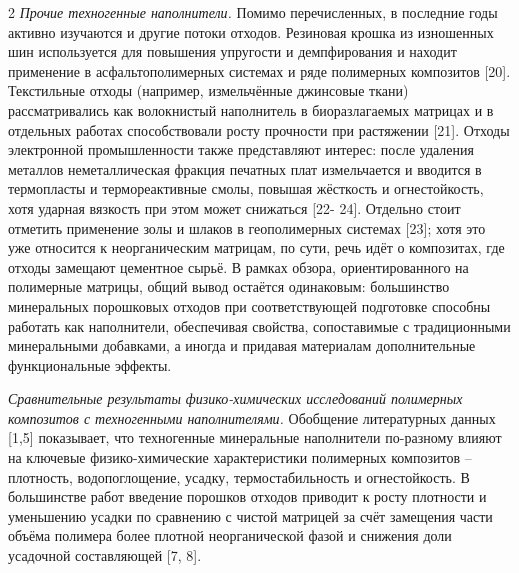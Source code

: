 \begin{multicols}{2}
\emph{Прочие техногенные наполнители.} Помимо перечисленных, в последние
годы активно изучаются и другие потоки отходов. Резиновая крошка из
изношенных шин используется для повышения упругости и демпфирования и
находит применение в асфальтополимерных системах и ряде полимерных
композитов {[}20{]}. Текстильные отходы (например, измельчённые
джинсовые ткани) рассматривались как волокнистый наполнитель в
биоразлагаемых матрицах и в отдельных работах способствовали росту
прочности при растяжении {[}21{]}. Отходы электронной промышленности
также представляют интерес: после удаления металлов неметаллическая
фракция печатных плат измельчается и вводится в термопласты и
термореактивные смолы, повышая жёсткость и огнестойкость, хотя ударная
вязкость при этом может снижаться {[}22- 24{]}. Отдельно стоит отметить
применение золы и шлаков в геополимерных системах {[}23{]}; хотя это уже
относится к неорганическим матрицам, по сути, речь идёт о композитах,
где отходы замещают цементное сырьё. В рамках обзора, ориентированного
на полимерные матрицы, общий вывод остаётся одинаковым: большинство
минеральных порошковых отходов при соответствующей подготовке способны
работать как наполнители, обеспечивая свойства, сопоставимые с
традиционными минеральными добавками, а иногда и придавая материалам
дополнительные функциональные эффекты.

\emph{Сравнительные результаты физико-химических исследований полимерных
композитов с техногенными наполнителями.} Обобщение литературных данных
{[}1,5{]} показывает, что техногенные минеральные наполнители по-разному
влияют на ключевые физико-химические характеристики полимерных
композитов -- плотность, водопоглощение, усадку, термостабильность и
огнестойкость. В большинстве работ введение порошков отходов приводит к
росту плотности и уменьшению усадки по сравнению с чистой матрицей за
счёт замещения части объёма полимера более плотной неорганической фазой
и снижения доли усадочной составляющей {[}7, 8{]}.


\end{multicols}
